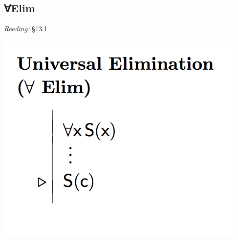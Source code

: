 \documentclass[12pt]{extarticle}
\begin{document}
\begin{multicols*}{3}
 
\section{∀Elim}
 
\emph{Reading:} §13.1
 
\begin{center}
\includegraphics[scale=0.3]{img/rule_universal_elim.png}
\end{center}
\vfill


 


\end{multicols*}
\end{document}

